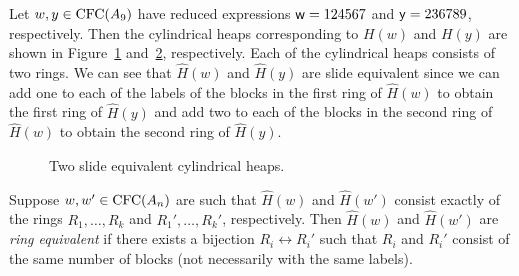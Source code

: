 \begin{example} Let $w,y \in \operatorname{\mathrm{CFC}}(A_9)$ have reduced expressions $\mathsf{w} = 124567$ and $\mathsf{y} = 236789$, respectively.
    Then the cylindrical heaps corresponding to $H(w)$ and $H(y)$ are shown in Figure~\ref{fig:slideexample1.1} and~\ref{fig:slideexample1.2}, respectively. Each of the cylindrical heaps consists of two rings.
    We can see that $\hat{H}(w)$ and $\hat{H}(y)$ are slide equivalent since we can add one to each of the labels of the blocks in the first ring of $\hat{H}(w)$ to obtain the first ring of $\hat{H}(y)$ and add two to each of the blocks in the second ring of $\hat{H}(w)$ to obtain the second ring of $\hat{H}(y)$.
\begin{center} \begin{figure}[H] \centering
\begin{subfigure}{0.4\textwidth} \centering
{}
\caption{}\label{fig:slideexample1.1}
\end{subfigure}
\begin{subfigure}{0.4\textwidth} \centering
{}
\caption{}\label{fig:slideexample1.2}
\end{subfigure}
\caption{Two slide equivalent cylindrical heaps.}\label{}
\end{figure} \end{center}
\end{example}
    
\begin{definition}
Suppose $w,w' \in \operatorname{\mathrm{CFC}}(A_n)$ are such that $\hat{H}(w)$ and $\hat{H}(w')$ consist exactly of the rings $R_1,\ldots,R_k$ and $R_1',\ldots,R_k'$, respectively.
    Then $\hat{H}(w)$ and $\hat{H}(w')$ are \emph{ring equivalent} if there exists a bijection $R_i \longleftrightarrow R_i'$ such that $R_i$ and $R_i'$ consist of the same number of blocks (not necessarily with the same labels).
\end{definition}
    
